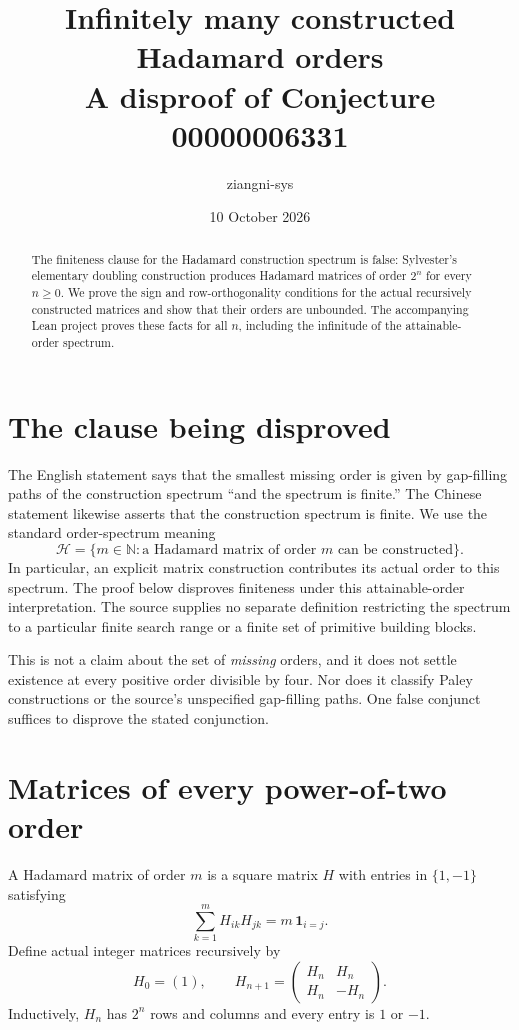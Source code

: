 \documentclass[11pt]{article}
\title{Infinitely many constructed Hadamard orders\\A disproof of Conjecture 00000006331}
\author{ziangni-sys}\date{10 October 2026}
\begin{document}
\maketitle
\begin{abstract}
The finiteness clause for the Hadamard construction spectrum is false: Sylvester's elementary doubling construction produces Hadamard matrices of order $2^n$ for every $n\ge0$. We prove the sign and row-orthogonality conditions for the actual recursively constructed matrices and show that their orders are unbounded. The accompanying Lean project proves these facts for all $n$, including the infinitude of the attainable-order spectrum.
\end{abstract}

\section{The clause being disproved}
The English statement says that the smallest missing order is given by gap-filling paths of the construction spectrum ``and the spectrum is finite.'' The Chinese statement likewise asserts that the construction spectrum is finite. We use the standard order-spectrum meaning
\[
\mathcal H=\{m\in\mathbb N:\text{a Hadamard matrix of order }m\text{ can be constructed}\}.
\]
In particular, an explicit matrix construction contributes its actual order to this spectrum. The proof below disproves finiteness under this attainable-order interpretation. The source supplies no separate definition restricting the spectrum to a particular finite search range or a finite set of primitive building blocks.

This is not a claim about the set of \emph{missing} orders, and it does not settle existence at every positive order divisible by four. Nor does it classify Paley constructions or the source's unspecified gap-filling paths. One false conjunct suffices to disprove the stated conjunction.

\section{Matrices of every power-of-two order}
A Hadamard matrix of order $m$ is a square matrix $H$ with entries in $\{1,-1\}$ satisfying
\[
\sum_{k=1}^{m}H_{ik}H_{jk}=m\,\mathbf 1_{i=j}.
\]
Define actual integer matrices recursively by
\[
H_0=(1),\qquad
H_{n+1}=\begin{pmatrix}H_n&H_n\\H_n&-H_n\end{pmatrix}.
\]
Inductively, $H_n$ has $2^n$ rows and columns and every entry is $1$ or $-1$.
\end{document}
